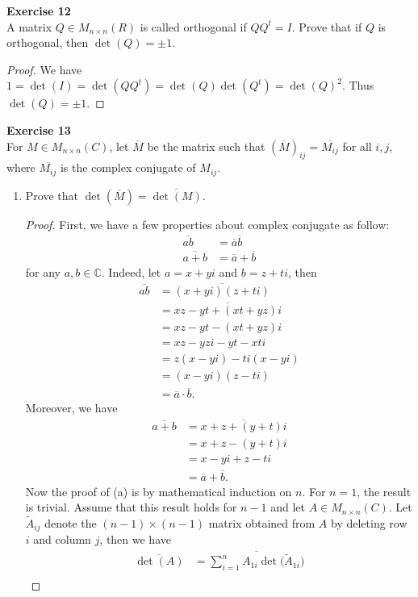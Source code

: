 \documentclass[12pt, a4paper]{article}
\theoremstyle{plain}
\newcommand{\C}{\mathbb{C}}
\newenvironment{exercise}[2][Exercise]
    { \begin{mdframed}[backgroundcolor=gray!20] \textbf{#1 #2} \\}
    {  \end{mdframed}}
\begin{document}
\begin{exercise}{12}
A matrix $Q\in M_{n\times n}(R)$ is called orthogonal if $QQ^t=I$. Prove that if $Q$ is orthogonal, then $\det(Q)=\pm 1$.
\end{exercise}
	\begin{proof}
	We have $1=\det(I)=\det(QQ^t)=\det(Q)\det(Q^t)=\det(Q)^2$. Thus $\det(Q)=\pm 1$.
	\end{proof}
	
\begin{exercise}{13}
For $M\in M_{n\times n}(C)$, let $\overline{M}$ be the matrix such that $(\overline{M})_{ij}=\overline{M_{ij}}$ for all $i,j$, where $\overline{M_{ij}}$ is the complex conjugate of $M_{ij}$.
	\begin{enumerate}[label=(\alph*)]
	\item Prove that $\det(\overline{M})=\overline{\det(M)}$.
		\begin{proof}
		First, we have a few properties about complex conjugate as follow:
		\begin{align*}
		\overline{ab}&=\overline{a}\overline{b}\\
		\overline{a+b}&=\overline{a}+\overline{b}
		\end{align*}
		for any $a,b\in\C$. Indeed, let $a=x+yi$ and $b=z+ti$, then
		\begin{align*}
		\overline{ab}&=\overline{(x+yi)(z+ti)}\\
		&=\overline{xz-yt+(xt+yz)i}\\
		&=xz-yt-(xt+yz)i\\
		&=xz-yzi-yt-xti\\
		&=z(x-yi)-ti(x-yi)\\
		&=(x-yi)(z-ti)\\
		&=\overline{a}\cdot\overline{b}.
		\end{align*}
		Moreover, we have
		\begin{align*}
		\overline{a+b}&=\overline{x+z+(y+t)i}\\
		&=x+z-(y+t)i\\
		&=x-yi+z-ti\\
		&=\overline{a}+\overline{b}.
		\end{align*}
		Now the proof of (a) is by mathematical induction on $n$. For $n=1$, the result is trivial. Assume that this result holds for $n-1$ and let $A\in M_{n\times n}(C)$. Let $\tilde{A}_{ij}$ denote the $(n-1)\times (n-1)$ matrix obtained from $A$ by deleting row $i$ and column $j$, then we have
		\begin{align*}
		\overline{\det(A)}&=\overline{\sum_{i=1}^{n}{A_{1i}\det(\tilde{A}_{1i}})}\\

\end{align*}
\end{proof}
\end{enumerate}
\end{exercise}
\end{document}
